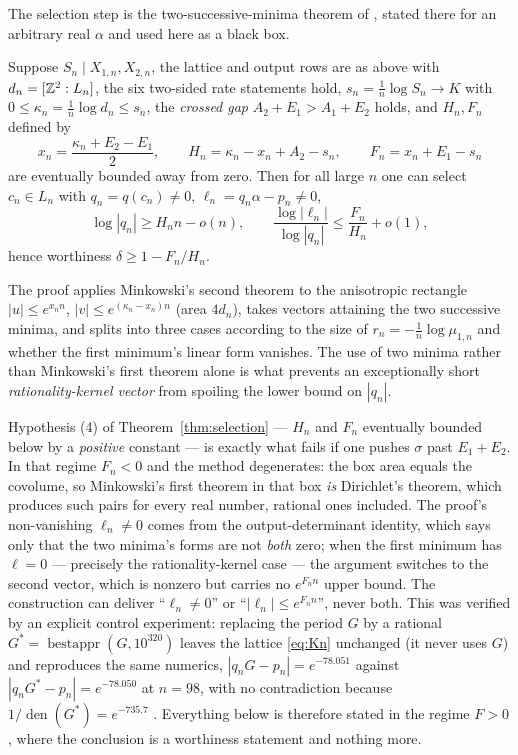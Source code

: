 The selection step is the two-successive-minima theorem of
\cite[Thm.~5.1]{ProjCatalanWindow}, stated there for an arbitrary real
$\alpha$ and used here as a black box.

\begin{theorem}
\label{thm:selection}
\Proved{} Suppose $S_n\mid X_{1,n},X_{2,n}$, the lattice and output rows are
as above with $d_n=[\mathbb{Z}^2:L_n]$, the six two-sided rate statements hold,
$s_n=\tfrac1n\log S_n\to K$ with $0\le\kappa_n=\tfrac1n\log d_n\le s_n$, the
\emph{crossed gap} $A_2+E_1>A_1+E_2$ holds, and $H_n,F_n$ defined by
\[
x_n=\frac{\kappa_n+E_2-E_1}{2},\qquad
H_n=\kappa_n-x_n+A_2-s_n,\qquad
F_n=x_n+E_1-s_n
\]
are eventually bounded away from zero.  Then for all large $n$ one can select
$c_n\in L_n$ with $q_n=q(c_n)\neq0$, $\ell_n=q_n\alpha-p_n\neq0$,
\[
\log|q_n|\ge H_nn-o(n),\qquad
\frac{\log|\ell_n|}{\log|q_n|}\le\frac{F_n}{H_n}+o(1),
\]
hence worthiness $\delta\ge1-F_n/H_n$.
\end{theorem}

The proof applies Minkowski's second theorem to the anisotropic rectangle
$|u|\le e^{x_nn}$, $|v|\le e^{(\kappa_n-x_n)n}$ (area $4d_n$), takes vectors
attaining the two successive minima, and splits into three cases according to
the size of $r_n=-\tfrac1n\log\mu_{1,n}$ and whether the first minimum's linear
form vanishes.  The use of two minima rather than Minkowski's first theorem
alone is what prevents an exceptionally short \emph{rationality-kernel vector}
from spoiling the lower bound on $|q_n|$.

\begin{remark}\label{rem:Fpos}
Hypothesis (4) of Theorem~\ref{thm:selection} --- $H_n$ and $F_n$ eventually
bounded below by a \emph{positive} constant --- is exactly what fails if one
pushes $\sigma$ past $E_1+E_2$.  In that regime $F_n<0$ and the method
degenerates: the box area equals the covolume, so Minkowski's first theorem in
that box \emph{is} Dirichlet's theorem, which produces such pairs for every
real number, rational ones included.  The proof's non-vanishing $\ell_n\neq0$
comes from the output-determinant identity, which says only that the two
minima's forms are not \emph{both} zero; when the first minimum has $\ell=0$
--- precisely the rationality-kernel case --- the argument switches to the
second vector, which is nonzero but carries no $e^{F_nn}$ upper bound.  The
construction can deliver ``$\ell_n\neq0$'' or ``$|\ell_n|\le e^{F_nn}$'', never
both.  This was verified by an explicit control experiment: replacing the
period $G$ by a rational $G^*=\operatorname{bestappr}(G,10^{320})$ leaves the
lattice \eqref{eq:Kn} unchanged (it never uses $G$) and reproduces the same
numerics, $|q_nG-p_n|=e^{-78.051}$ against $|q_nG^*-p_n|=e^{-78.050}$ at
$n=98$, with no contradiction because $1/\operatorname{den}(G^*)=e^{-735.7}$
\cite[\S4]{ProjCatalanAudit}.  Everything below is therefore stated in the
regime $F>0$, where the conclusion is a worthiness statement and nothing more.
\end{remark}

